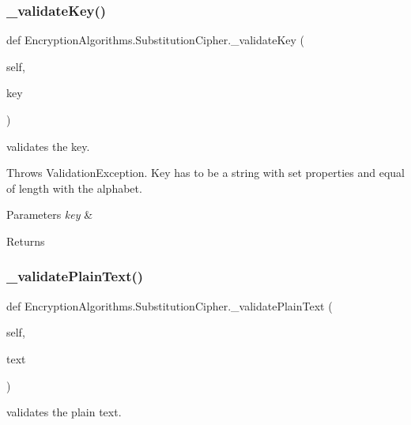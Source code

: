 \subsubsection{\texorpdfstring{\+\_\+validate\+Key()}{\_validateKey()}}
{\footnotesize\ttfamily def Encryption\+Algorithms.\+Substitution\+Cipher.\+\_\+validate\+Key (\begin{DoxyParamCaption}\item[{}]{self,  }\item[{}]{key }\end{DoxyParamCaption})\hspace{0.3cm}{\ttfamily [private]}}



validates the key. 

Throws Validation\+Exception. Key has to be a string with set properties and equal of length with the alphabet.


\begin{DoxyParams}{Parameters}
{\em key} & \\
\hline
\end{DoxyParams}
\begin{DoxyReturn}{Returns}

\end{DoxyReturn}
\mbox{\label{classEncryptionAlgorithms_1_1SubstitutionCipher_a0dc91efdbee882c4b1e1fbcb2c6a8709}} 
\subsubsection{\texorpdfstring{\+\_\+validate\+Plain\+Text()}{\_validatePlainText()}}
{\footnotesize\ttfamily def Encryption\+Algorithms.\+Substitution\+Cipher.\+\_\+validate\+Plain\+Text (\begin{DoxyParamCaption}\item[{}]{self,  }\item[{}]{text }\end{DoxyParamCaption})\hspace{0.3cm}{\ttfamily [private]}}



validates the plain text. 

